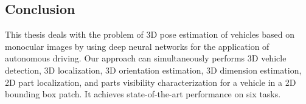  \subsection{Conclusion}
 This thesis deals with the problem of 3D pose estimation of vehicles based on monocular images by using deep neural networks for the application of autonomous driving. Our approach can simultaneously performs 3D vehicle detection, 3D localization, 3D orientation estimation, 3D dimension estimation, 2D part localization, and parts visibility characterization for a vehicle in a 2D bounding box patch. It achieves state-of-the-art performance on six tasks. \tbd